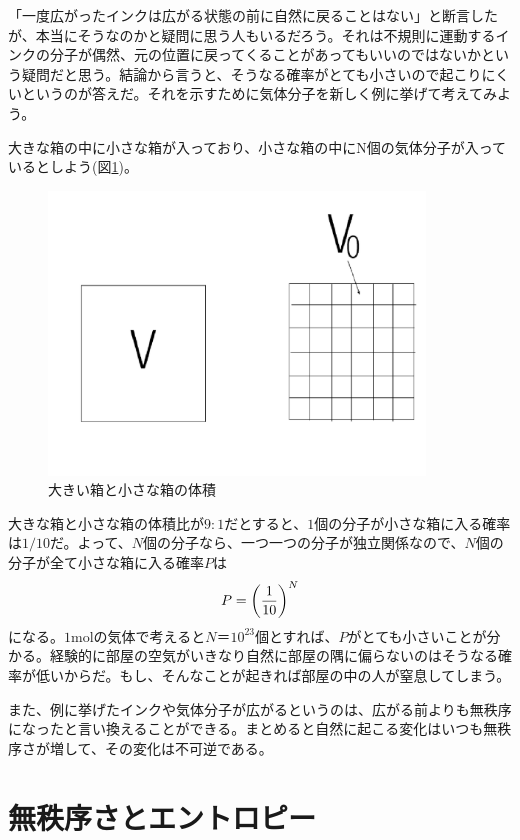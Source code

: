 「一度広がったインクは広がる状態の前に自然に戻ることはない」と断言したが、本当にそうなのかと疑問に思う人もいるだろう。それは不規則に運動するインクの分子が偶然、元の位置に戻ってくることがあってもいいのではないかという疑問だと思う。結論から言うと、そうなる確率がとても小さいので起こりにくいというのが答えだ。それを示すために気体分子を新しく例に挙げて考えてみよう。\par
大きな箱の中に小さな箱が入っており、小さな箱の中にN個の気体分子が入っているとしよう(図\ref{fig:V})。\begin{figure}[H]
  \centering
  \includegraphics[width=10cm]{nishimura/image/2017112202.png}
  \caption{大きい箱と小さな箱の体積}
  \label{fig:V}
\end{figure}

大きな箱と小さな箱の体積比が$9:1$だとすると、$1$個の分子が小さな箱に入る確率は$1/10$だ。よって、$N$個の分子なら、一つ一つの分子が独立関係なので、$N$個の分子が全て小さな箱に入る確率$P$は
\begin{align}
 P=\left (\frac{1}{10}\right)^N \notag
\end{align}
になる。$1\mathrm{mol}$の気体で考えると$N＝10^{23}$個とすれば、$P$がとても小さいことが分かる。経験的に部屋の空気がいきなり自然に部屋の隅に偏らないのはそうなる確率が低いからだ。もし、そんなことが起きれば部屋の中の人が窒息してしまう。\par
また、例に挙げたインクや気体分子が広がるというのは、広がる前よりも無秩序になったと言い換えることができる。まとめると自然に起こる変化はいつも無秩序さが増して、その変化は不可逆である。

%
\section{無秩序さとエントロピー}
